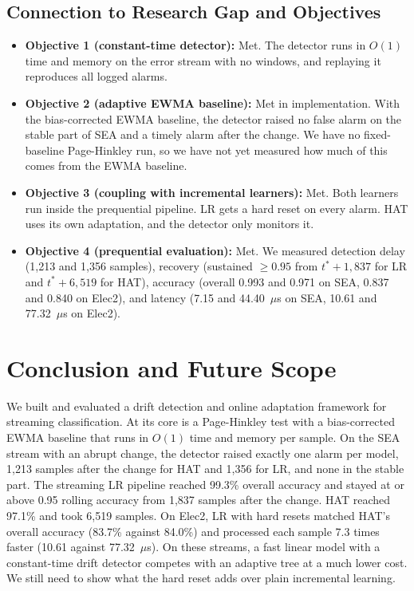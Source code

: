 \documentclass[conference]{IEEEtran}
\begin{document}
\subsection{Connection to Research Gap and Objectives}
\begin{itemize}
    \item \textbf{Objective 1 (constant-time detector):} Met. The detector runs in $O(1)$ time and memory on the error stream with no windows, and replaying it reproduces all logged alarms.
    \item \textbf{Objective 2 (adaptive EWMA baseline):} Met in implementation. With the bias-corrected EWMA baseline, the detector raised no false alarm on the stable part of SEA and a timely alarm after the change. We have no fixed-baseline Page-Hinkley run, so we have not yet measured how much of this comes from the EWMA baseline.
    \item \textbf{Objective 3 (coupling with incremental learners):} Met. Both learners run inside the prequential pipeline. LR gets a hard reset on every alarm. HAT uses its own adaptation, and the detector only monitors it.
    \item \textbf{Objective 4 (prequential evaluation):} Met. We measured detection delay (1{,}213 and 1{,}356 samples), recovery (sustained $\ge 0.95$ from $t^* + 1{,}837$ for LR and $t^* + 6{,}519$ for HAT), accuracy (overall 0.993 and 0.971 on SEA, 0.837 and 0.840 on Elec2), and latency (7.15 and 44.40~$\mu$s on SEA, 10.61 and 77.32~$\mu$s on Elec2).
\end{itemize}

\section{Conclusion and Future Scope}
We built and evaluated a drift detection and online adaptation framework for streaming classification.
At its core is a Page-Hinkley test with a bias-corrected EWMA baseline that runs in $O(1)$ time and memory per sample.
On the SEA stream with an abrupt change, the detector raised exactly one alarm per model, 1{,}213 samples after the change for HAT and 1{,}356 for LR, and none in the stable part.
The streaming LR pipeline reached 99.3\% overall accuracy and stayed at or above 0.95 rolling accuracy from 1{,}837 samples after the change.
HAT reached 97.1\% and took 6{,}519 samples.
On Elec2, LR with hard resets matched HAT's overall accuracy (83.7\% against 84.0\%) and processed each sample 7.3 times faster (10.61 against 77.32~$\mu$s).
On these streams, a fast linear model with a constant-time drift detector competes with an adaptive tree at a much lower cost.
We still need to show what the hard reset adds over plain incremental learning.
\end{document}
